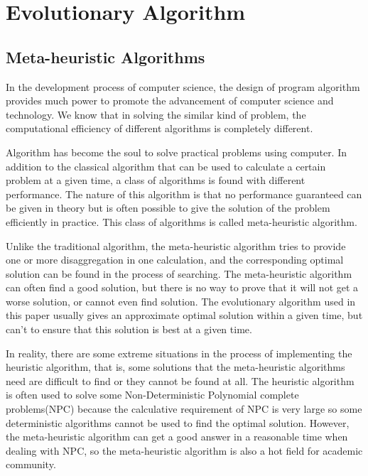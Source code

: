 
\section{Evolutionary Algorithm}

\subsection{Meta-heuristic Algorithms}
%
In the development process of computer science, the design of program 
algorithm provides much power to promote the advancement of computer science 
and technology. We know that in solving the similar kind of problem, the 
computational efficiency of different algorithms is completely different. 


Algorithm has become the soul to solve practical problems using computer. In
addition to the classical algorithm that can be used to calculate a certain
problem at a given time, a class of algorithms is found with different
performance. The nature of this algorithm is that no performance guaranteed can
be given in theory but is often possible to give the solution of the problem
efficiently in practice. This class of algorithms is called meta-heuristic
algorithm.

Unlike the traditional algorithm, the meta-heuristic algorithm tries to 
provide one or more disaggregation in one calculation, and the corresponding 
optimal solution can be found in the process of searching. The meta-heuristic 
algorithm can often find a good solution, but there is no way to prove that 
it will not get a worse solution, or cannot even find solution. The 
evolutionary algorithm used in this paper usually gives an approximate 
optimal solution within a given time, but can’t to ensure that this solution 
is best at a given time.

In reality, there are some extreme situations in the process of implementing 
the heuristic algorithm, that is, some solutions that the meta-heuristic 
algorithms need are difficult to find or they cannot be found at all. The 
heuristic algorithm is often used to solve some Non-Deterministic Polynomial 
complete problems(NPC) because the calculative requirement of NPC is very 
large so some deterministic algorithms cannot be used to find the optimal 
solution. However, the meta-heuristic algorithm can get a good answer in a 
reasonable time when dealing with NPC, so the meta-heuristic algorithm is 
also a hot field for academic community.

